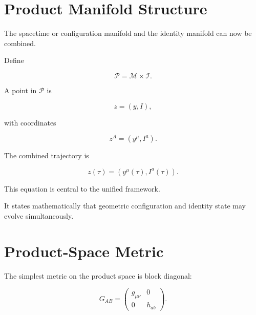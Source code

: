 \documentclass[12pt,oneside]{book}
\begin{document}
\section{Product Manifold Structure}
\label{sec:product-manifold-structure}

The spacetime or configuration manifold and the identity
manifold can now be combined.

Define

\begin{equation}
    \mathcal{P}
    =
    \mathcal{M}
    \times
    \mathcal{I}.
    \label{eq:geometry-product-manifold}
\end{equation}

A point in \(\mathcal{P}\) is

\begin{equation}
    z
    =
    (y,I),
\end{equation}

with coordinates

\begin{equation}
    z^A
    =
    \left(
        y^\mu,
        I^a
    \right).
    \label{eq:product-coordinates}
\end{equation}

The combined trajectory is

\begin{equation}
    z(\tau)
    =
    \left(
        y^\mu(\tau),
        I^a(\tau)
    \right).
    \label{eq:combined-product-trajectory}
\end{equation}

This equation is central to the unified framework.

It states mathematically that geometric configuration and
identity state may evolve simultaneously.


\section{Product-Space Metric}
\label{sec:product-space-metric}

The simplest metric on the product space is block diagonal:

\begin{equation}
    G_{AB}
    =
    \begin{pmatrix}
        g_{\mu\nu} & 0 \\
        0 & h_{ab}
    \end{pmatrix}.
    \label{eq:block-diagonal-product-metric}
\end{equation}
\end{document}
